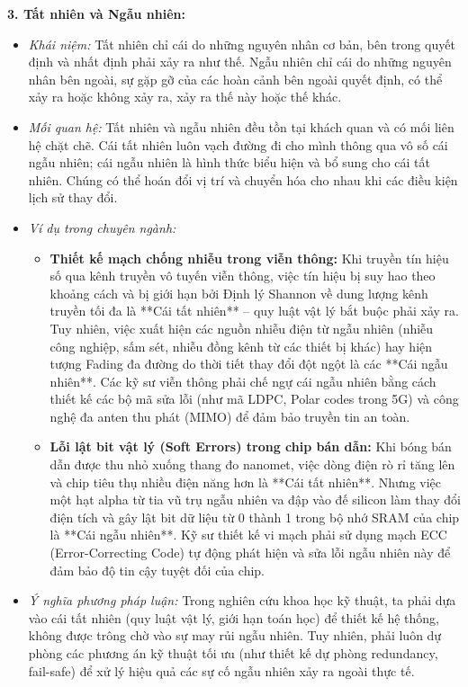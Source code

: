 \documentclass[12pt,a4paper]{article}
\begin{document}
{\noindent
\textbf{3. Tất nhiên và Ngẫu nhiên:}
\begin{itemize}
    \item \textit{Khái niệm:} Tất nhiên chỉ cái do những nguyên nhân cơ bản, bên trong quyết định và nhất định phải xảy ra như thế. Ngẫu nhiên chỉ cái do những nguyên nhân bên ngoài, sự gặp gỡ của các hoàn cảnh bên ngoài quyết định, có thể xảy ra hoặc không xảy ra, xảy ra thế này hoặc thế khác.
    \item \textit{Mối quan hệ:} Tất nhiên và ngẫu nhiên đều tồn tại khách quan và có mối liên hệ chặt chẽ. Cái tất nhiên luôn vạch đường đi cho mình thông qua vô số cái ngẫu nhiên; cái ngẫu nhiên là hình thức biểu hiện và bổ sung cho cái tất nhiên. Chúng có thể hoán đổi vị trí và chuyển hóa cho nhau khi các điều kiện lịch sử thay đổi.
    \item \textit{Ví dụ trong chuyên ngành:}
    \begin{itemize}
        \item \textbf{Thiết kế mạch chống nhiễu trong viễn thông:} Khi truyền tín hiệu số qua kênh truyền vô tuyến viễn thông, việc tín hiệu bị suy hao theo khoảng cách và bị giới hạn bởi Định lý Shannon về dung lượng kênh truyền tối đa là **Cái tất nhiên** -- quy luật vật lý bắt buộc phải xảy ra. Tuy nhiên, việc xuất hiện các nguồn nhiễu điện từ ngẫu nhiên (nhiễu công nghiệp, sấm sét, nhiễu đồng kênh từ các thiết bị khác) hay hiện tượng Fading đa đường do thời tiết thay đổi đột ngột là các **Cái ngẫu nhiên**. Các kỹ sư viễn thông phải chế ngự cái ngẫu nhiên bằng cách thiết kế các bộ mã sửa lỗi (như mã LDPC, Polar codes trong 5G) và công nghệ đa anten thu phát (MIMO) để đảm bảo truyền tin an toàn.
        \item \textbf{Lỗi lật bit vật lý (Soft Errors) trong chip bán dẫn:} Khi bóng bán dẫn được thu nhỏ xuống thang đo nanomet, việc dòng điện rò rỉ tăng lên và chip tiêu thụ nhiều điện năng hơn là **Cái tất nhiên**. Nhưng việc một hạt alpha từ tia vũ trụ ngẫu nhiên va đập vào đế silicon làm thay đổi điện tích và gây lật bit dữ liệu từ 0 thành 1 trong bộ nhớ SRAM của chip là **Cái ngẫu nhiên**. Kỹ sư thiết kế vi mạch phải sử dụng mạch ECC (Error-Correcting Code) tự động phát hiện và sửa lỗi ngẫu nhiên này để đảm bảo độ tin cậy tuyệt đối của chip.
    \end{itemize}
    \item \textit{Ý nghĩa phương pháp luận:} Trong nghiên cứu khoa học kỹ thuật, ta phải dựa vào cái tất nhiên (quy luật vật lý, giới hạn toán học) để thiết kế hệ thống, không được trông chờ vào sự may rủi ngẫu nhiên. Tuy nhiên, phải luôn dự phòng các phương án kỹ thuật tối ưu (như thiết kế dự phòng redundancy, fail-safe) để xử lý hiệu quả các sự cố ngẫu nhiên xảy ra ngoài thực tế.
\end{itemize}

}
\end{document}
